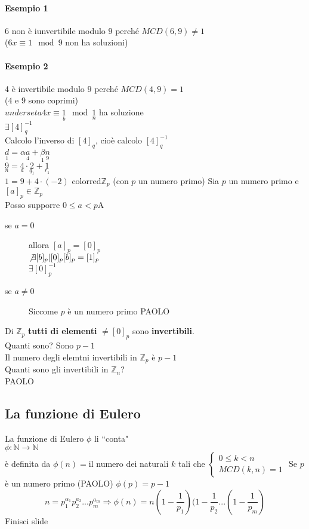 \paragraph{Esempio 1} $6$ non è iunvertibile modulo $9$ perché $MCD(6,9)\neq 1$\\
($6x\equiv 1\mod 9$ non ha soluzioni)
\paragraph{Esempio 2} 4 è invertibile modulo $9$ perché $MCD(4,9)=1$\\
($4$ e $9$ sono coprimi)\\
$underset{a}{4} x\equiv \underset{b}{1}\mod \underset{n}{1}$ ha soluzione\\
$\exists [4]_q^{-1}$\\
Calcolo l'inverso di $[4]_q$, cioè calcolo $[4]_q^{-1}$\\
$\underset{1}{d}=\alpha\underset{4}{a}+\underset{1}{\beta}\underset{9}{n}$\\
$\underset{n}{9}=\underset{a}{4}\cdot\underset{q_1}{2}+\underset{r_1}{1}$\\
$1=9+4\cdot (-2)$
{color{red}$\mathbb{Z}_p$ (con $p$ un numero primo)}
Sia $p$ un numero primo e $[a]_p\in\mathbb{Z}_p$\\
Posso supporre $0\leq a < p$A\\
\begin{description}
    \item [se $a = 0$] allora $[a]_p=[0]_p$\\
        $\not\exists [b]_p|[0]_p[b]_p=[1]_p$\\
        $\exists [0]_p^{-1}$
    \item[se $a\neq 0$] {\color{red} Siccome $p$ è un numero primo}
        {\color{purple}PAOLO}
\end{description}
Di $\mathbb{Z}_p$ \textbf{tutti di elementi} $\neq [0]_p$ sono \textbf{invertibili}.\\
Quanti sono? Sono $p-1$\\
Il numero degli elemtni invertibili in $\mathbb{Z}_p$ è $p-1$\\
Quanti sono gli invertibili in $\mathbb{Z}_n$?\\
{\color{purple}PAOLO}
\subsection{La funzione di Eulero}
La funzione di Eulero $\phi$ li ``conta"\\
$\phi : \mathbb{N}\longrightarrow\mathbb{N}$\\
è definita da $\phi(n)=$il numero dei naturali $k$ tali che 
$
\begin{cases}
    0\leq k<n\\
    MCD(k,n)=1
\end{cases}
$
Se $p$ è un numero primo ({\color{purple}PAOLO}) $\phi(p)=p-1$
$$n=p_1^{\alpha_1}p_2^{a_2}...p_m^{a_m}\Longrightarrow\phi(n)=n(1-\frac{1}{p_1})(1-\frac{1}{p_2}...
(1-\frac{1}{p_m})$$
Finisci slide 
